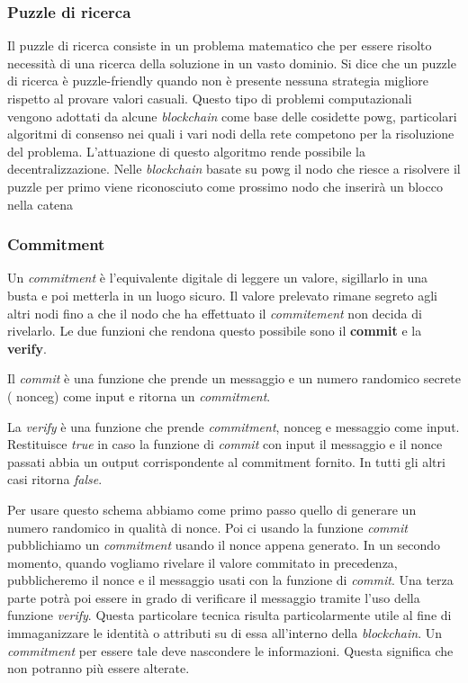 \subsubsection{Puzzle di ricerca}
Il puzzle di ricerca consiste in un problema matematico che per essere risolto necessità di una ricerca della soluzione in un vasto dominio. Si dice che un puzzle di ricerca è puzzle-friendly quando non è presente nessuna strategia migliore rispetto al provare valori casuali. Questo tipo di problemi computazionali vengono adottati da alcune \emph{blockchain} come base delle cosidette \gls{powg}, particolari algoritmi di consenso nei quali i vari nodi della rete competono per la risoluzione del problema. L'attuazione di questo algoritmo rende possibile la decentralizzazione. Nelle \emph{blockchain} basate su \gls{powg} il nodo che riesce a risolvere il puzzle per primo viene riconosciuto come prossimo nodo che inserirà un blocco nella catena 

\subsubsection{Commitment}
Un \emph{commitment} è l'equivalente digitale di leggere un valore, sigillarlo in una busta e poi metterla in un luogo sicuro. Il valore prelevato rimane segreto agli altri nodi fino a che il nodo che ha effettuato il \emph{commitement} non decida di rivelarlo. Le due funzioni che rendona questo possibile sono il \textbf{commit} e la \textbf{verify}.

Il \emph{commit} è una funzione che prende un messaggio e un numero randomico secrete ( \gls{nonceg}\glsfirstoccur) come input e ritorna un  \emph{commitment}.

La \emph{verify} è una funzione che prende \emph{commitment}, \gls{nonceg} e messaggio come input. Restituisce \emph{true} in caso la funzione di \emph{commit} con input il messaggio e il nonce passati abbia un output corrispondente al commitment fornito. In tutti gli altri casi ritorna \emph{false}.

Per usare questo schema abbiamo come primo passo quello di generare un numero randomico in qualità di nonce. Poi ci usando la funzione \emph{commit} pubblichiamo un \emph{commitment} usando il nonce appena generato. In un secondo momento, quando vogliamo rivelare il valore commitato in precedenza, pubblicheremo il nonce e il messaggio usati con la funzione di \emph{commit}. Una terza parte potrà poi essere in grado di verificare il messaggio tramite l'uso della funzione \emph{verify}.
Questa particolare tecnica risulta particolarmente utile al fine di immaganizzare le identità o attributi su di essa all'interno della \emph{blockchain}. Un \emph{commitment} per essere tale deve nascondere le informazioni. Questa significa che non potranno più essere alterate. 

